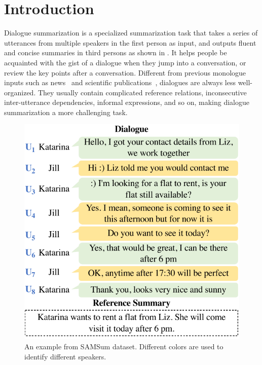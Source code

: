 \section{Introduction}

Dialogue summarization is a specialized summarization task that takes
a series of utterances from multiple speakers in the first person as input,
and outputs fluent and concise summaries in third persons as shown in 
. It helps people be acquainted with the gist of a dialogue 
when they jump into a conversation, or review
the key points after a conversation.
Different from previous monologue inputs such as news~\cite{narayan2018don} and scientific publications~\cite{cohan2018discourse}, dialogues are always less well-organized. They usually contain complicated reference relations, inconsecutive inter-utterance dependencies, informal expressions, and so on, making dialogue summarization a more challenging task.


\begin{figure}
	\centering
	\includegraphics[width=0.85\columnwidth]{example.pdf}
	\caption{An example from SAMSum dataset. Different colors are used 
to identify different speakers.}
	\label{fig:example}
\end{figure}

